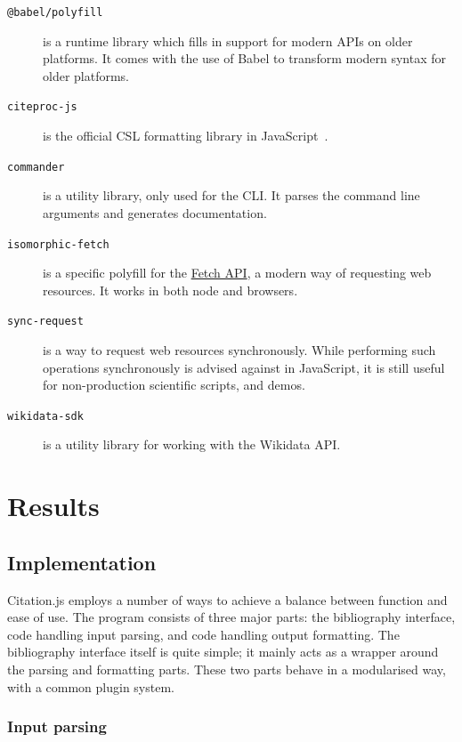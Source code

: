 \documentclass[fleqn,10pt,lineno]{wlpeerj} %
\begin{document}
\begin{description}
\item[\texttt{@babel/polyfill}]
is a runtime library which fills in support for modern APIs on older platforms. It comes with the use of Babel to transform modern syntax for older platforms.

\item[\texttt{citeproc-js}]
is the official CSL formatting library in JavaScript~\citep{noauthor_csl_nodate}.

\item[\texttt{commander}]
is a utility library, only used for the CLI. It parses the command line arguments and generates documentation.

\item[\texttt{isomorphic-fetch}]
is a specific polyfill for the \href{https://developer.mozilla.org/en-US/docs/Web/API/Fetch_API}{Fetch API}, a modern way of requesting web resources. It works in both node and browsers.

\item[\texttt{sync-request}]
is a way to request web resources synchronously. While performing such operations synchronously is advised against in JavaScript, it is still useful for non-production scientific scripts, and demos.

\item[\texttt{wikidata-sdk}]
is a utility library for working with the Wikidata API.
\end{description}

\section*{Results}

\subsection*{Implementation}

Citation.js employs a number of ways to achieve a balance between function and ease of use. The program consists of three major parts: the bibliography interface, code handling input parsing, and code handling output formatting. The bibliography interface itself is quite simple; it mainly acts as a wrapper around the parsing and formatting parts. These two parts behave in a modularised way, with a common plugin system.

\subsubsection*{Input parsing}
\end{document}
